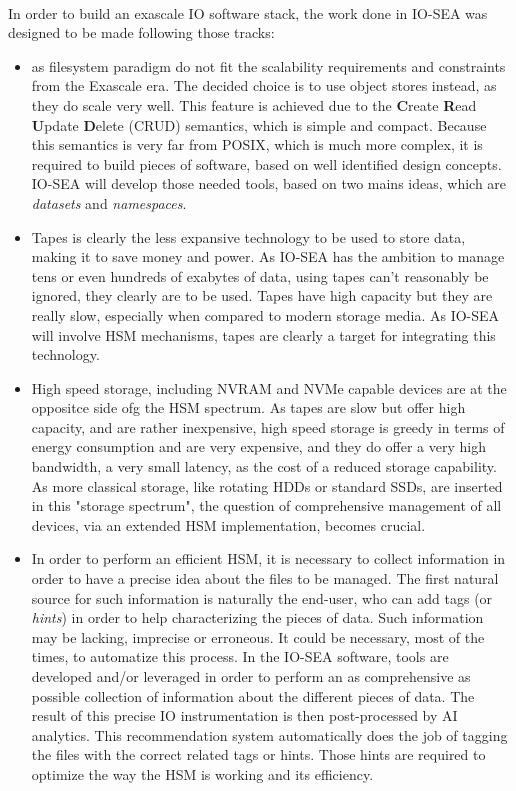 \paragraph{}
In order to build an exascale IO software stack, the work done in IO-SEA was designed to be made following
those tracks:
\begin{itemize}
    \item as filesystem paradigm do not fit the scalability requirements and constraints from the Exascale era.
    The decided choice is to use object stores instead, as they do scale very well. This feature is achieved 
    due to the \textbf{C}reate \textbf{R}ead \textbf{U}pdate \textbf{D}elete (CRUD) semantics, which is simple 
    and compact. Because this semantics is very far from POSIX, which is much more complex, it is required to 
    build pieces of software, based on well identified design concepts. IO-SEA will develop those needed tools, 
    based on two mains ideas, which are \textit{datasets} and \textit{namespaces}. 
    
    \item Tapes is clearly the less expansive technology to be used to store data, making it to save money and 
    power. As IO-SEA has the ambition to manage tens or even hundreds of exabytes of data, using tapes can't
    reasonably be ignored, they clearly are to be used. Tapes have high capacity but they are really slow,
    especially when compared to modern storage media. As IO-SEA will involve HSM mechanisms, tapes are clearly
    a target for integrating this technology.
    
    \item High speed storage, including NVRAM and NVMe capable devices are at the oppositce side ofg the HSM 
    spectrum. As tapes are slow but offer high capacity, and are rather inexpensive, high speed storage is greedy
    in terms of energy consumption and are very expensive, and they do offer a very high bandwidth, a very small
    latency, as the cost of a reduced storage capability. As more classical storage, like rotating HDDs or
    standard SSDs, are inserted in this "storage spectrum", the question of comprehensive management of all
    devices, via an extended HSM implementation, becomes crucial.
    
    \item In order to perform an efficient HSM, it is necessary to collect information in order to have a 
    precise idea about the files to be managed. The first natural source for such information is naturally
    the end-user, who can add tags (or \textit{hints}) in order to help characterizing the pieces of data. Such
    information may be lacking, imprecise or erroneous. It could be necessary, most of the times, to automatize
    this process. In the IO-SEA software, tools are developed and/or leveraged in order to perform an as
    comprehensive as possible collection of information about the different pieces of data. The result of this
    precise IO instrumentation is then post-processed by AI analytics. This recommendation system automatically
    does the job of tagging the files with the correct related tags or hints. Those hints are required to 
    optimize the way the HSM is working and its efficiency. 
    

\end{itemize}
